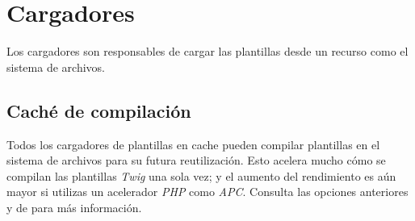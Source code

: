 \documentclass[letterpaper,10pt,spanish]{sphinxmanual}
\begin{document}
\chapter{Cargadores}
\label{api:cargadores}
Los cargadores son responsables de cargar las plantillas desde un recurso como el sistema de archivos.


\section{Caché de compilación}
\label{api:cache-de-compilacion}
Todos los cargadores de plantillas en cache pueden compilar plantillas en el sistema de archivos para su futura reutilización. Esto acelera mucho cómo se compilan las plantillas \emph{Twig} una sola vez; y el aumento del rendimiento es aún mayor si utilizas un acelerador \emph{PHP} como \emph{APC}.
Consulta las opciones anteriores  y  de  para más información.
\end{document}
